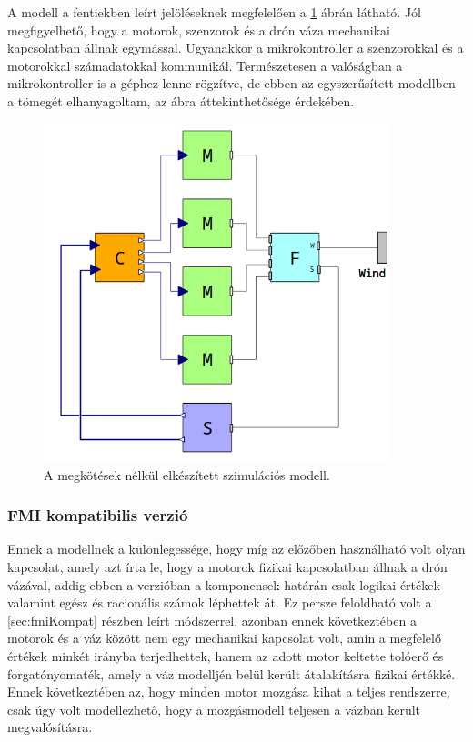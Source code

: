         A modell a fentiekben leírt jelöléseknek megfelelően a \ref{fig:stdSzim} ábrán látható.
        Jól megfigyelhető, hogy a motorok, szenzorok és a drón váza mechanikai kapcsolatban állnak egymással.
        Ugyanakkor a mikrokontroller a szenzorokkal és a motorokkal számadatokkal kommunikál.
        Természetesen a valóságban a mikrokontroller is a géphez lenne rögzítve, de ebben az egyszerűsített modellben a tömegét elhanyagoltam, az ábra áttekinthetősége érdekében.

        \begin{figure}[!ht]
            \centering
            \includegraphics[width=100mm, keepaspectratio]{figures/stdSzim.png}
            \caption{A megkötések nélkül elkészített szimulációs modell.} 
            \label{fig:stdSzim}
        \end{figure}

        \subsubsection{FMI kompatibilis verzió}
        Ennek a modellnek a különlegessége, hogy míg az előzőben használható volt olyan kapcsolat, amely azt írta le, hogy a motorok fizikai kapcsolatban állnak a drón vázával, addig ebben a verzióban a komponensek határán csak logikai értékek valamint egész és racionális számok léphettek át.
        Ez persze feloldható volt a \ref{sec:fmiKompat} részben leírt módszerrel, azonban ennek következtében a motorok és a váz között nem egy mechanikai kapcsolat volt, amin a megfelelő értékek minkét irányba terjedhettek, hanem az adott motor keltette tolóerő és forgatónyomaték, amely a váz modelljén belül került átalakításra fizikai értékké. Ennek következtében az, hogy minden motor mozgása kihat a teljes rendszerre, csak úgy volt modellezhető, hogy a mozgásmodell teljesen a vázban került megvalósításra.

